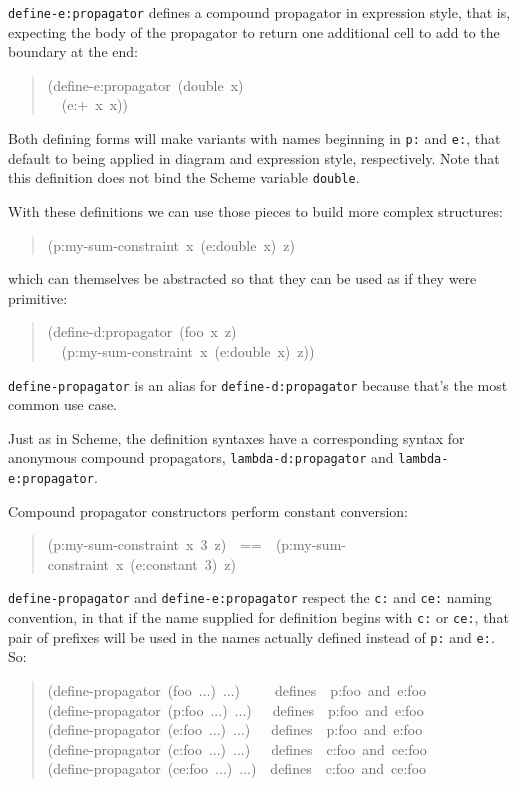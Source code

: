 \documentclass[12pt,letterpaper,english]{article}
\begin{document}
\texttt{define-e:propagator} defines a compound propagator in expression
style, that is, expecting the body of the propagator to return one
additional cell to add to the boundary at the end:
\begin{quote}{\ttfamily \raggedright \noindent
(define-e:propagator~(double~x)~\\
~~(e:+~x~x))
}\end{quote}

Both defining forms will make variants with names beginning in \texttt{p:}
and \texttt{e:}, that default to being applied in diagram and expression
style, respectively.  Note that this definition does not bind
the Scheme variable \texttt{double}.

With these definitions we can use those pieces to build more complex
structures:
\begin{quote}{\ttfamily \raggedright \noindent
(p:my-sum-constraint~x~(e:double~x)~z)
}\end{quote}
which can themselves be abstracted so that they can be used
as if they were primitive:
\begin{quote}{\ttfamily \raggedright \noindent
(define-d:propagator~(foo~x~z)~\\
~~(p:my-sum-constraint~x~(e:double~x)~z))
}\end{quote}

\texttt{define-propagator} is an alias for \texttt{define-d:propagator} because
that's the most common use case.

Just as in Scheme, the definition syntaxes have a corresponding
syntax for anonymous compound propagators, \texttt{lambda-d:propagator} and
\texttt{lambda-e:propagator}.

Compound propagator constructors perform constant conversion:
\begin{quote}{\ttfamily \raggedright \noindent
(p:my-sum-constraint~x~3~z)~~==~~(p:my-sum-constraint~x~(e:constant~3)~z)
}\end{quote}

\texttt{define-propagator} and \texttt{define-e:propagator} respect the \texttt{c:}
and \texttt{ce:} naming convention, in that if the name supplied for
definition begins with \texttt{c:} or \texttt{ce:}, that pair of prefixes will
be used in the names actually defined instead of \texttt{p:} and \texttt{e:}.
So:
\begin{quote}{\ttfamily \raggedright \noindent
(define-propagator~(foo~...)~...)~~~~~defines~~p:foo~and~e:foo~\\
(define-propagator~(p:foo~...)~...)~~~defines~~p:foo~and~e:foo~\\
(define-propagator~(e:foo~...)~...)~~~defines~~p:foo~and~e:foo~\\
(define-propagator~(c:foo~...)~...)~~~defines~~c:foo~and~ce:foo~\\
(define-propagator~(ce:foo~...)~...)~~defines~~c:foo~and~ce:foo
}\end{quote}
\end{document}
